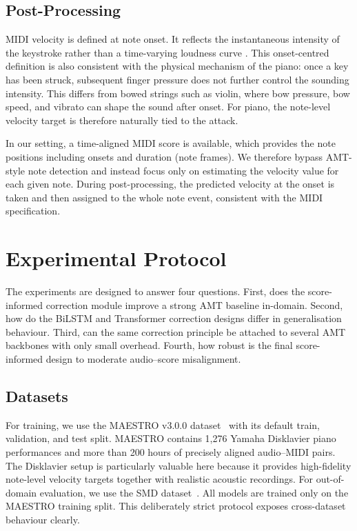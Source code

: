 \subsection{Post-Processing}
\label{sec:scoreinf:post}

MIDI velocity is defined at note onset. It reflects the instantaneous intensity of the keystroke rather than a time-varying loudness curve \cite{dan2006psy}. This onset-centred definition is also consistent with the physical mechanism of the piano: once a key has been struck, subsequent finger pressure does not further control the sounding intensity. This differs from bowed strings such as violin, where bow pressure, bow speed, and vibrato can shape the sound after onset. For piano, the note-level velocity target is therefore naturally tied to the attack.

In our setting, a time-aligned MIDI score is available, which provides the note positions including onsets and duration (note frames). We therefore bypass AMT-style note detection and instead focus only on estimating the velocity value for each given note. During post-processing, the predicted velocity at the onset is taken and then assigned to the whole note event, consistent with the MIDI specification.

\section{Experimental Protocol}
\label{sec:scoreinf:exp}

The experiments are designed to answer four questions. First, does the score-informed correction module improve a strong AMT baseline in-domain. Second, how do the BiLSTM and Transformer correction designs differ in generalisation behaviour. Third, can the same correction principle be attached to several AMT backbones with only small overhead. Fourth, how robust is the final score-informed design to moderate audio--score misalignment.

\subsection{Datasets}
\label{sec:scoreinf:datasets}

For training, we use the MAESTRO v3.0.0 dataset~\cite{hawthorne2019maestro} with its default train, validation, and test split. MAESTRO contains 1,276 Yamaha Disklavier piano performances and more than 200 hours of precisely aligned audio--MIDI pairs. The Disklavier setup is particularly valuable here because it provides high-fidelity note-level velocity targets together with realistic acoustic recordings. For out-of-domain evaluation, we use the SMD dataset~\cite{smd}. All models are trained only on the MAESTRO training split. This deliberately strict protocol exposes cross-dataset behaviour clearly.

